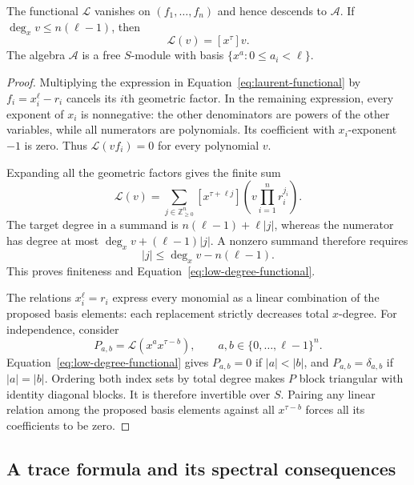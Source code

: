 \begin{lemma}\label{lem:monomial-basis}
The functional $\mathcal L$ vanishes on $(f_1,\ldots,f_n)$ and hence
descends to $\mathcal A$.  If $\deg_x v\le n(\ell-1)$, then
\begin{equation}\label{eq:low-degree-functional}
 \mathcal L(v)=[x^\tau]v.
\end{equation}
The algebra $\mathcal A$ is a free $S$-module with basis
$\{x^a:0\le a_i<\ell\}$.
\end{lemma}

\begin{proof}
Multiplying the expression in Equation~\eqref{eq:laurent-functional}
by $f_i=x_i^\ell-r_i$ cancels its $i$th geometric factor.  In the
remaining expression, every exponent of $x_i$ is nonnegative:
the other denominators are powers of the other variables, while all
numerators are polynomials.  Its coefficient with $x_i$-exponent $-1$
is zero.  Thus $\mathcal L(vf_i)=0$ for every polynomial $v$.

Expanding all the geometric factors gives the finite sum
\begin{equation}\label{eq:laurent-coefficient-sum}
 \mathcal L(v)=\sum_{j\in\mathbb Z_{\ge0}^n}
 [x^{\tau+\ell j}]\left(v\prod_{i=1}^n r_i^{j_i}\right).
\end{equation}
The target degree in a summand is $n(\ell-1)+\ell|j|$, whereas the
numerator has degree at most $\deg_x v+(\ell-1)|j|$.  A nonzero
summand therefore requires
\begin{equation}\label{eq:residue-truncation}
 |j|\le\deg_x v-n(\ell-1).
\end{equation}
This proves finiteness and Equation~\eqref{eq:low-degree-functional}.

The relations $x_i^\ell=r_i$ express every monomial as a linear
combination of the proposed basis elements: each replacement strictly
decreases total $x$-degree.  For independence, consider
\[
 P_{a,b}=\mathcal L(x^a x^{\tau-b}),
 \qquad a,b\in\{0,\ldots,\ell-1\}^n.
\]
Equation~\eqref{eq:low-degree-functional} gives $P_{a,b}=0$ if
$|a|<|b|$, and $P_{a,b}=\delta_{a,b}$ if $|a|=|b|$.
Ordering both index sets by total degree makes $P$ block triangular
with identity diagonal blocks.  It is therefore invertible over $S$.
Pairing any linear relation among the proposed basis elements against
all $x^{\tau-b}$ forces all its coefficients to be zero.
\end{proof}

\subsection{A trace formula and its spectral consequences}

